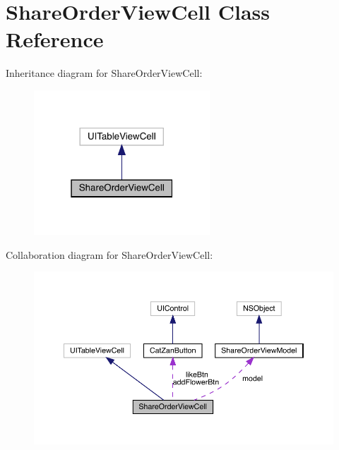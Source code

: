 \hypertarget{interface_share_order_view_cell}{}\section{Share\+Order\+View\+Cell Class Reference}
\label{interface_share_order_view_cell}


Inheritance diagram for Share\+Order\+View\+Cell\+:\nopagebreak
\begin{figure}[H]
\begin{center}
\leavevmode
\includegraphics[width=187pt]{interface_share_order_view_cell__inherit__graph}
\end{center}
\end{figure}


Collaboration diagram for Share\+Order\+View\+Cell\+:\nopagebreak
\begin{figure}[H]
\begin{center}
\leavevmode
\includegraphics[width=350pt]{interface_share_order_view_cell__coll__graph}
\end{center}
\end{figure}

